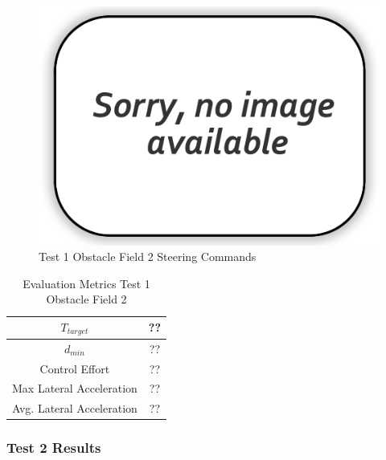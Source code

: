 \documentclass[12pt,twocolumn]{article}
\begin{document}
\begin{figure}
	\centering
	\includegraphics[width=\columnwidth]{Figs/no-image.png}
	\caption{\small Test 1 Obstacle Field 2 Steering Commands}  
	\label{fig:Test1_Obst2_Steer}
\end{figure}

\begin{table}
\begin{center}
	\begin{tabular}{||c |c||} 
		\hline
		$T_{target}$ & ??\\ 
		\hline
		$d_{min}$ & ??\\
		\hline
		Control Effort & ??\\
		\hline
		Max Lateral Acceleration & ??\\
		\hline
		Avg. Lateral Acceleration & ??\\
		\hline
	\end{tabular}
\end{center}
\caption{Evaluation Metrics Test 1 Obstacle Field 2}
\label{t:EvalTest1Obst2}
\end{table}

\subsubsection{Test 2 Results}\label{sss:Test2}
\end{document}
